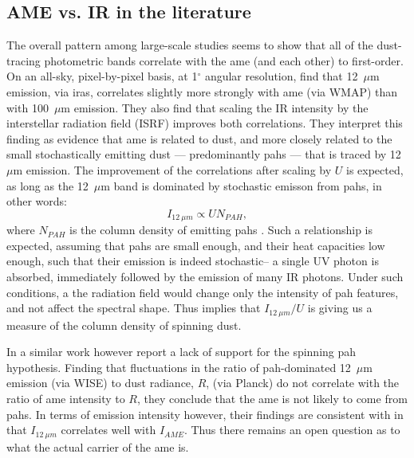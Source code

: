        \subsection{AME vs. IR in the literature}
          The overall pattern among large-scale studies seems to show that all of the dust-tracing photometric bands correlate with the \acrshort{ame} (and each other) to first-order.  On an all-sky, pixel-by-pixel basis, at 1$^{\circ}$ angular resolution, \cite{ysard10b} find that 12~$\mu$m emission, via \acrshort{iras}, correlates slightly more strongly with \acrshort{ame} (via WMAP) than with 100~$\mu$m emission.  They also find that scaling the IR intensity by the interstellar radiation field (ISRF) improves both correlations. They interpret this finding as evidence that \acrshort{ame} is related to dust, and more closely related to the small stochastically emitting dust --- predominantly \acrshort{pah}s --- that is traced by 12~$\mu$m emission. The improvement of the correlations after scaling by $U$ is expected, as long as the 12~$\mu$m band is dominated by stochastic emisson from \acrshort{pah}s, in other words:
            \begin{equation}
              I_{12~\mu{}m} \propto{} UN_{PAH},
            \end{equation}
          where $N_{PAH}$ is the column density of emitting \acrshort{pah}s \citep{onaka00}. Such a relationship is expected, assuming that \acrshort{pah}s are small enough, and their heat capacities low enough, such that their emission is indeed stochastic-- a single UV photon is absorbed, immediately followed by the emission of many IR photons. Under such conditions, a the radiation field would change only the intensity of \acrshort{pah} features, and not affect the spectral shape. Thus \cite{ysard10b} implies that $I_{12~\mu{}m}/U$ is giving us a measure of the column density of spinning dust.

          In a similar work however \cite{hensley16} report a lack of support for the spinning \acrshort{pah} hypothesis. Finding that fluctuations in the ratio of \acrshort{pah}-dominated 12~$\mu$m emission (via WISE) to dust radiance, $R$, (via Planck) do not correlate with the ratio of \acrshort{ame} intensity to $R$, they conclude that the \acrshort{ame} is not likely to come from \acrshort{pah}s. In terms of emission intensity however, their findings are consistent with \cite{ysard10b} in that $I_{12~\mu{}m}$ correlates well with $I_{AME}$. Thus there remains an open question as to what the actual carrier of the \acrshort{ame} is.

